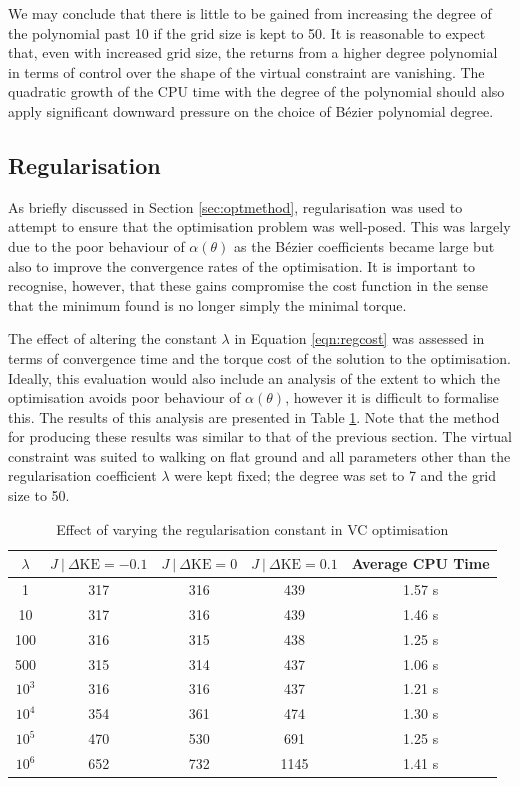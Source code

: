 We may conclude that there is little to be gained from increasing the degree of the polynomial past 10 if the grid size is kept to 50. It is reasonable to expect that, even with increased grid size, the returns from a higher degree polynomial in terms of control over the shape of the virtual constraint are vanishing. The quadratic growth of the CPU time with the degree of the polynomial should also apply significant downward pressure on the choice of Bézier polynomial degree.

\subsection{Regularisation}
As briefly discussed in Section \ref{sec:optmethod}, regularisation was used to attempt to ensure that the optimisation problem was well-posed. This was largely due to the poor behaviour of $\alpha(\theta)$ as the Bézier coefficients became large but also to improve the convergence rates of the optimisation. It is important to recognise, however, that these gains compromise the cost function in the sense that the minimum found is no longer simply the minimal torque.

The effect of altering the constant $\lambda$ in Equation \ref{eqn:regcost} was assessed in terms of convergence time and the torque cost of the solution to the optimisation. Ideally, this evaluation would also include an analysis of the extent to which the optimisation avoids poor behaviour of $\alpha(\theta)$, however it is difficult to formalise this. The results of this analysis are presented in Table \ref{tab:reg}. Note that the method for producing these results was similar to that of the previous section. The virtual constraint was suited to walking on flat ground and all parameters other than the regularisation coefficient $\lambda$ were kept fixed; the degree was set to 7 and the grid size to 50.

\begin{table}
	\centering
	\begin{tabular}{c || c | c |c || c}
		$\lambda$ & $J~|~{\Delta\mathrm{KE}=-0.1}$ & $J~|~{\Delta\mathrm{KE}=0}$ & $J~|~{\Delta\mathrm{KE}=0.1}$ & Average CPU Time \\ \hline
		 1        & 317 & 316 & 439  & 1.57 s \\
		 10       & 317 & 316 & 439  & 1.46 s \\
		 100      & 316 & 315 & 438  & 1.25 s \\
		 500      & 315 & 314 & 437  & 1.06 s \\
		 $10^3$   & 316 & 316 & 437  & 1.21 s \\
		 $10^4$   & 354 & 361 & 474  & 1.30 s \\
		 $10^5$   & 470 & 530 & 691  & 1.25 s \\
		 $10^6$   & 652 & 732 & 1145  & 1.41 s \\
	\end{tabular}
	\caption{Effect of varying the regularisation constant in VC optimisation}
	\label{tab:reg}
\end{table}

